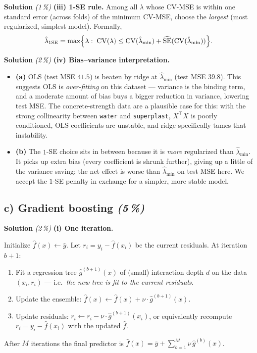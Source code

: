 \documentclass[11pt,a4paper]{article}
\newcommand{\subpoints}[1]{\textit{(#1\,\%)}}
\newcommand{\sol}{\noindent\textbf{Solution}}
\begin{document}
\medskip
\sol{} \subpoints{1} \textbf{(iii) 1-SE rule.} Among all $\lambda$ whose CV-MSE is within one
standard error (across folds) of the minimum CV-MSE, choose the \emph{largest} (most regularized,
simplest model). Formally,
$$\hat\lambda_{1\mathrm{SE}} = \max\Bigl\{\lambda:\;\mathrm{CV}(\lambda) \leq \mathrm{CV}(\hat\lambda_{\min}) + \widehat{\mathrm{SE}}(\mathrm{CV}(\hat\lambda_{\min}))\Bigr\}.$$

\medskip
\sol{} \subpoints{2} \textbf{(iv) Bias--variance interpretation.}
\begin{itemize}
  \item \textbf{(a)} OLS (test MSE $41.5$) is beaten by ridge at $\hat\lambda_{\min}$ (test MSE
        $39.8$). This suggests OLS is \emph{over-fitting} on this dataset --- variance is the
        binding term, and a moderate amount of bias buys a bigger reduction in variance, lowering
        test MSE. The concrete-strength data are a plausible case for this: with the strong
        collinearity between \texttt{water} and \texttt{superplast}, $X^\top X$ is poorly
        conditioned, OLS coefficients are unstable, and ridge specifically tames that instability.
  \item \textbf{(b)} The $1$-SE choice sits in between because it is \emph{more} regularized than
        $\hat\lambda_{\min}$. It picks up extra bias (every coefficient is shrunk further), giving
        up a little of the variance saving; the net effect is worse than $\hat\lambda_{\min}$ on
        test MSE here. We accept the $1$-SE penalty in exchange for a simpler, more stable model.
\end{itemize}

\subsection*{c) Gradient boosting \subpoints{5}}

\sol{} \subpoints{2} \textbf{(i) One iteration.}

Initialize $\hat f(x) \leftarrow \bar y$. Let $r_i = y_i - \hat f(x_i)$ be the current residuals.
At iteration $b+1$:
\begin{enumerate}
  \item Fit a regression tree $\hat g^{(b+1)}(x)$ of (small) interaction depth $d$ on the data
        $(x_i, r_i)$ --- i.e.\ \emph{the new tree is fit to the current residuals}.
  \item Update the ensemble: $\hat f(x) \leftarrow \hat f(x) + \nu \cdot \hat g^{(b+1)}(x)$.
  \item Update residuals: $r_i \leftarrow r_i - \nu \cdot \hat g^{(b+1)}(x_i)$, or equivalently
        recompute $r_i = y_i - \hat f(x_i)$ with the updated $\hat f$.
\end{enumerate}
After $M$ iterations the final predictor is $\hat f(x) = \bar y + \sum_{b=1}^{M} \nu\,\hat g^{(b)}(x)$.
\end{document}
